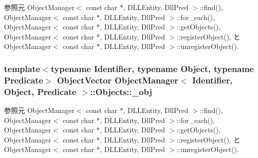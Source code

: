 参照元 ObjectManager$<$ const char $\ast$, DLLEntity, DllPred $>$::find(), ObjectManager$<$ const char $\ast$, DLLEntity, DllPred $>$::for\_\-each(), ObjectManager$<$ const char $\ast$, DLLEntity, DllPred $>$::getObjects(), ObjectManager$<$ const char $\ast$, DLLEntity, DllPred $>$::registerObject(), と ObjectManager$<$ const char $\ast$, DLLEntity, DllPred $>$::unregisterObject().

\subsubsection[{\_\-obj}]{\setlength{\rightskip}{0pt plus 5cm}template$<$typename Identifier, typename Object, typename Predicate$>$ {\bf ObjectVector} {\bf ObjectManager}$<$ Identifier, Object, Predicate $>$::{\bf Objects::\_\-obj}}\label{structObjectManager_1_1Objects_a74ee31f4dee7742b10865096f5b23bc7}


参照元 ObjectManager$<$ const char $\ast$, DLLEntity, DllPred $>$::find(), ObjectManager$<$ const char $\ast$, DLLEntity, DllPred $>$::for\_\-each(), ObjectManager$<$ const char $\ast$, DLLEntity, DllPred $>$::getObjects(), ObjectManager$<$ const char $\ast$, DLLEntity, DllPred $>$::registerObject(), と ObjectManager$<$ const char $\ast$, DLLEntity, DllPred $>$::unregisterObject().

